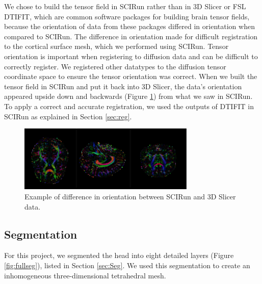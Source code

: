 We chose to build the tensor field in SCIRun rather than in 3D Slicer \cite{ref:slicer} or FSL DTIFIT, which are common software packages for building brain tensor fields, because the orientation of data from these packages differed in orientation when compared to SCIRun. The difference in orientation made for difficult registration to the cortical surface mesh, which we performed using SCIRun. Tensor orientation is important when registering to diffusion data and can be difficult to correctly register. We registered other datatypes to the diffusion tensor coordinate space to ensure the tensor orientation was correct. When we built the tensor field in SCIRun and put it back into 3D Slicer, the data's orientation appeared upside down and backwards (Figure \ref{fig:backwards}) from what we saw in SCIRun. To apply a correct and accurate registration, we used the outputs of DTIFIT in SCIRun as explained in Section \ref{sec:reg}.

\begin{figure}[H]
\begin{center}
\includegraphics[width=0.75\textwidth]{Figures/backwards.png}
\caption{Example of difference in orientation between SCIRun and 3D
  Slicer data.}
\label{fig:backwards}
\end{center}
\end{figure}

\subsection{Segmentation}

For this project, we segmented the head into eight detailed layers (Figure \ref{fig:fullseg}), listed in Section \ref{sec:Seg}. We used this segmentation to create an inhomogeneous three-dimensional tetrahedral mesh.

